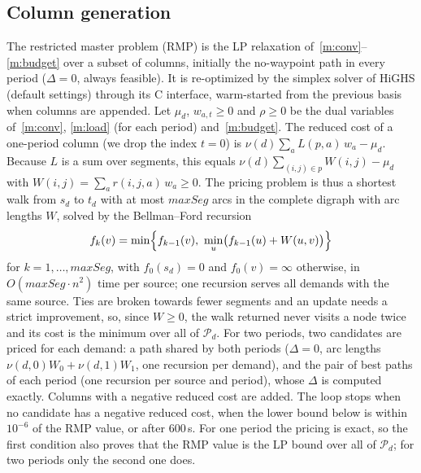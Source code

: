 \documentclass[conference]{IEEEtran}
\begin{document}
\subsection{Column generation}
The restricted master problem (RMP) is the LP relaxation of~\eqref{m:conv}--\eqref{m:budget} over a subset of columns, initially the no-waypoint path in every period ($\Delta=0$, always feasible). It is re-optimized by the simplex solver of HiGHS (default settings) through its C interface, warm-started from the previous basis when columns are appended. Let $\mu_d$, $w_{a,t}\ge0$ and $\rho\ge0$ be the dual variables of~\eqref{m:conv}, \eqref{m:load} (for each period) and~\eqref{m:budget}. The reduced cost of a one-period column (we drop the index $t=0$) is $\nu(d)\sum_a L(p,a)\,w_a-\mu_d$. Because $L$ is a sum over segments, this equals $\nu(d)\sum_{(i,j)\in p}W(i,j)-\mu_d$ with $W(i,j)=\sum_a r(i,j,a)\,w_a\ge0$. The pricing problem is thus a shortest walk from $s_d$ to $t_d$ with at most $maxSeg$ arcs in the complete digraph with arc lengths $W$, solved by the Bellman--Ford recursion
\[
f_k(v)=\min\Bigl\{f_{k-1}(v),\ \min_{u}\bigl(f_{k-1}(u)+W(u,v)\bigr)\Bigr\}
\]
for $k=1,\dots,maxSeg$, with $f_0(s_d)=0$ and $f_0(v)=\infty$ otherwise, in $O(maxSeg\cdot n^2)$ time per source; one recursion serves all demands with the same source. Ties are broken towards fewer segments and an update needs a strict improvement, so, since $W\ge0$, the walk returned never visits a node twice and its cost is the minimum over all of $\mathcal P_d$. For two periods, two candidates are priced for each demand: a path shared by both periods ($\Delta=0$, arc lengths $\nu(d,0)W_0+\nu(d,1)W_1$, one recursion per demand), and the pair of best paths of each period (one recursion per source and period), whose $\Delta$ is computed exactly. Columns with a negative reduced cost are added. The loop stops when no candidate has a negative reduced cost, when the lower bound below is within $10^{-6}$ of the RMP value, or after 600\,s. For one period the pricing is exact, so the first condition also proves that the RMP value is the LP bound over all of $\mathcal P_d$; for two periods only the second one does.
\end{document}
